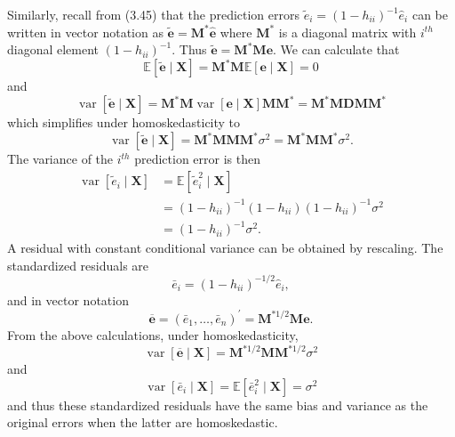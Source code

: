 \documentclass[10pt]{article}
\begin{document}
Similarly, recall from (3.45) that the prediction errors $\widetilde{e}_{i}=\left(1-h_{i i}\right)^{-1} \widehat{e}_{i}$ can be written in vector notation as $\widetilde{\boldsymbol{e}}=\boldsymbol{M}^{*} \widehat{\boldsymbol{e}}$ where $\boldsymbol{M}^{*}$ is a diagonal matrix with $i^{t h}$ diagonal element $\left(1-h_{i i}\right)^{-1}$. Thus $\widetilde{\boldsymbol{e}}=\boldsymbol{M}^{*} \boldsymbol{M} \boldsymbol{e}$. We can calculate that
$$
\mathbb{E}[\tilde{\boldsymbol{e}} \mid \boldsymbol{X}]=\boldsymbol{M}^{*} \boldsymbol{M} \mathbb{E}[\boldsymbol{e} \mid \boldsymbol{X}]=0
$$
and
$$
\operatorname{var}[\widetilde{\boldsymbol{e}} \mid \boldsymbol{X}]=\boldsymbol{M}^{*} \boldsymbol{M} \operatorname{var}[\boldsymbol{e} \mid \boldsymbol{X}] \boldsymbol{M} \boldsymbol{M}^{*}=\boldsymbol{M}^{*} \boldsymbol{M D} \boldsymbol{M} \boldsymbol{M}^{*}
$$
which simplifies under homoskedasticity to
$$
\operatorname{var}[\widetilde{\boldsymbol{e}} \mid \boldsymbol{X}]=\boldsymbol{M}^{*} \boldsymbol{M} \boldsymbol{M} \boldsymbol{M}^{*} \sigma^{2}=\boldsymbol{M}^{*} \boldsymbol{M} \boldsymbol{M}^{*} \sigma^{2} .
$$
The variance of the $i^{t h}$ prediction error is then
$$
\begin{aligned}
\operatorname{var}\left[\widetilde{e}_{i} \mid \boldsymbol{X}\right] &=\mathbb{E}\left[\widetilde{e}_{i}^{2} \mid \boldsymbol{X}\right] \\
&=\left(1-h_{i i}\right)^{-1}\left(1-h_{i i}\right)\left(1-h_{i i}\right)^{-1} \sigma^{2} \\
&=\left(1-h_{i i}\right)^{-1} \sigma^{2} .
\end{aligned}
$$
A residual with constant conditional variance can be obtained by rescaling. The standardized residuals are
$$
\bar{e}_{i}=\left(1-h_{i i}\right)^{-1 / 2} \widehat{e}_{i},
$$
and in vector notation
$$
\overline{\boldsymbol{e}}=\left(\bar{e}_{1}, \ldots, \bar{e}_{n}\right)^{\prime}=\boldsymbol{M}^{* 1 / 2} \boldsymbol{M e} .
$$
From the above calculations, under homoskedasticity,
$$
\operatorname{var}[\overline{\boldsymbol{e}} \mid \boldsymbol{X}]=\boldsymbol{M}^{* 1 / 2} \boldsymbol{M} \boldsymbol{M}^{* 1 / 2} \sigma^{2}
$$
and
$$
\operatorname{var}\left[\bar{e}_{i} \mid \boldsymbol{X}\right]=\mathbb{E}\left[\bar{e}_{i}^{2} \mid \boldsymbol{X}\right]=\sigma^{2}
$$
and thus these standardized residuals have the same bias and variance as the original errors when the latter are homoskedastic.
\end{document}
